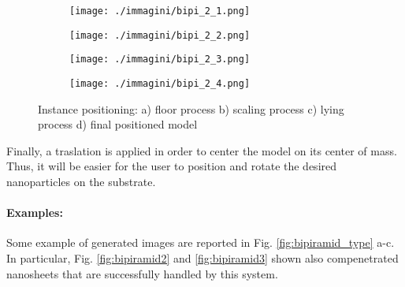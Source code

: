 \begin{figure}[ht]
    \centering
    \begin{subfigure}[b]{0.22\textwidth}
        \texttt{[image: ./immagini/bipi\_2\_1.png]}
        \caption{}
        \label{fig:bipyramids_positioning1}
    \end{subfigure}
    \hfill
    \begin{subfigure}[b]{0.22\textwidth}
        \texttt{[image: ./immagini/bipi\_2\_2.png]}
        \caption{}
        \label{fig:bipyramids_positioning2}
    \end{subfigure}
    \hfill
    \begin{subfigure}[b]{0.22\textwidth}
        \texttt{[image: ./immagini/bipi\_2\_3.png]}
        \caption{}
        \label{fig:bipyramids_positioning3}
    \end{subfigure}
    \hfill
    \begin{subfigure}[b]{0.22\textwidth}
        \texttt{[image: ./immagini/bipi\_2\_4.png]}
        \caption{}
        \label{fig:bipyramids_positioning4}
    \end{subfigure}
    \caption{Instance positioning: a) floor process b) scaling process c) lying process d) final positioned model}
    \label{fig:bipyramids_positioning}
\end{figure}


\newpage

Finally, a traslation is applied in order to center the model on its center of mass. Thus, it will be easier for the user to position and rotate the desired nanoparticles on the substrate.

\paragraph{Examples: }

Some example of generated images are reported in Fig. \ref{fig:bipiramid_type} a-c. In particular, Fig. \ref{fig:bipiramid2} and \ref{fig:bipiramid3} shown also compenetrated nanosheets that are successfully handled by this system.

